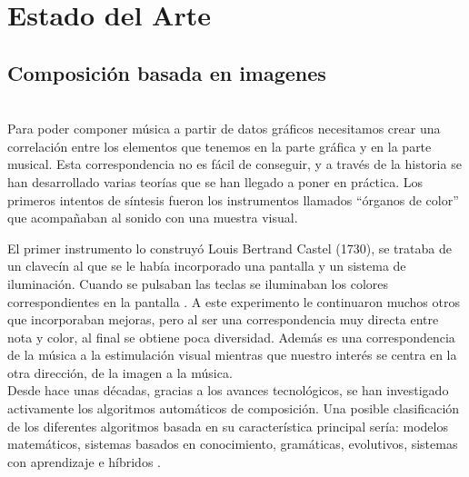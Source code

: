 \section{Estado del Arte}
\label{sec:estadodelarte}



\subsection{Composición basada en imagenes}

\\

Para poder componer música a partir de datos gráficos necesitamos crear una correlación entre los elementos que tenemos en la parte gráfica y en la parte musical. Esta correspondencia no es fácil de conseguir, y a través de la historia se han desarrollado varias teorías que se han llegado a poner en práctica. Los primeros intentos de síntesis fueron los instrumentos llamados ``órganos de color'' que acompañaban al sonido con una muestra visual.

El primer instrumento lo construyó Louis Bertrand Castel (1730), se trataba de un clavecín al que se le había incorporado una pantalla y un sistema de iluminación. Cuando se pulsaban las teclas se iluminaban los colores correspondientes en la pantalla \cite{organosColor}. A este experimento le continuaron muchos otros que incorporaban mejoras, pero al ser una correspondencia muy directa entre nota y color, al final se obtiene poca diversidad. Además es una correspondencia de la música a la estimulación visual mientras que nuestro interés se centra en la otra dirección, de la imagen a la música.\\

Desde hace unas décadas, gracias a los avances tecnológicos, se han investigado activamente los algoritmos automáticos de composición. Una posible clasificación de los diferentes algoritmos basada en su característica principal sería: modelos matemáticos, sistemas basados en conocimiento, gramáticas, evolutivos, sistemas con aprendizaje e híbridos \cite{AIMethodsForComposition}. \\

